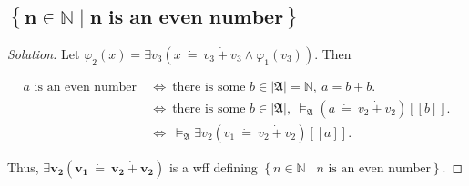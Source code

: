 \documentclass{article}
\newcommand{\set}[1]{\left\{#1\right\}}
\newenvironment{solution}{\begin{proof}[\noindent\it Solution]}{\end{proof}}
\begin{document}
\subsection{$\boldsymbol{\set{n\in\mathbb{N}\mid n\text{ is an even number}}}$}
\vspace{.5em}
\begin{solution}
    Let $\varphi_2(x)=\exists v_3 \left(x\ \dot{=}\ v_3\ \dot{+}\ v_3\land \varphi_1(v_3)\right)$.
    Then 

    \vspace{-2.8em}
    \begin{align*}
        a\text{ is an even number}\ &\Longleftrightarrow\ \text{there is some }b\in|\mathfrak{A}|=\mathbb{N},\ a = b + b. \\
        &\Longleftrightarrow\ \text{there is some }b\in|\mathfrak{A}|,\ \vDash_\mathfrak{A} \left(a\ \dot{=}\ v_2\ \dot{+}\ v_2\right)[\![b]\!]. \\
        &\Longleftrightarrow\ \vDash_\mathfrak{A} \exists v_2 \left(v_1\ \dot{=}\ v_2\ \dot{+}\ v_2\right) [\![a]\!].
    \end{align*}

    \vspace{-0.8em} \hspace{2.6em}
    Thus, $\boldsymbol{\exists v_2 \left(v_1\ \dot{=}\ v_2\ \dot{+}\ v_2\right)}$ is a wff defining $\set{n\in\mathbb{N}\mid n\text{ is an even number}}$.
\end{solution}

\vspace{1em}
\end{document}
